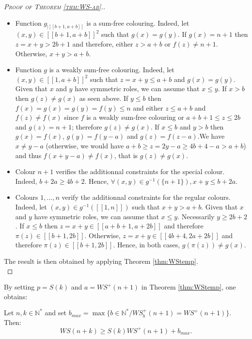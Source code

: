 \documentclass[final,onefignum,onetabnum]{siamart190516}
\newcommand{\WS}{\mathit{WS}}
\begin{document}
\begin{proof}[\textsc{Proof of Theorem \ref{thm:WS-ab}.}]
\begin{itemize}
\item Function \(g_{|[\![b + 1, a + b]\!]}\) is a sum-free colouring. Indeed, let \((x, y) \in 
	[\![b + 1, a + b]\!]^2\) such that \(g(x) = g(y)\). If \(g(x) = n + 1\) then \(z = x + y > 2 b + 1\) 
	and therefore, either \(z > a + b\) or \(f(z) \neq n + 1\). Otherwise, \(x + y > a + b\).
\item Function \(g\) is a weakly sum-free colouring. Indeed, let \((x, y) \in [\![1, a + b]\!]^2\) such that 
	\(z = x + y \leqslant a + b\) and \(g(x) = g(y)\). Given that \(x\) and \(y\) have symmetric roles, 
	we can assume that \(x \leqslant y\). If \(x > b\) then \(g(z) \neq g(x)\) as seen above. If \(y \leqslant b\) then 
	\(f(x) = g(x) = g(y) = f(y) \leqslant n\) and either \(z \leqslant a + b\) and \(f(z) \neq f(x)\) since \(f\) is a weakly 
	sum-free colouring or \(a + b + 1 \leqslant z \leqslant 2 b\) and \(g(z) = n + 1\); therefore \(g(z) \neq g(x)\). If 
	\(x \leqslant b\) and \(y > b\) then \(g(x) = f(x)\), \(g(y) = f(y - a)\) and \(g(z) = f(z - a)\).We have \(x \neq y - a\) 
	(otherwise, we would have \(a + b \geqslant z = 2 y  - a \geqslant 4 b + 4 - a > a + b\)) and thus \(f(x + y - a) \neq f(x)\),
	that is \(g(z) \neq g(x)\).
\item Colour \(n + 1\) verifies the additionnal constraints for the special colour. Indeed, \(b + 2 a \geqslant 4 b + 2\). 
	Hence, \(\forall (x, y) \in g^{-1}(\{n + 1\}), x + y \leqslant b + 2 a\).
\item Colours \(1, ..., n\) verify the additionnal constraints for the regular colours. Indeed, let 
	\((x, y) \in g^{-1}([\![1, n]\!])\) such that \(x + y > a + b\). Given that \(x\) and \(y\) have symmetric roles, 
	we can assume that \(x \leqslant y\). Necessarily \(y \geqslant 2 b + 2\). If \(x \leqslant b\) then 
	\(z = x + y \in [\![a + b + 1, a + 2 b]\!]\) and therefore \(\pi(z) \in [\![b + 1, 2 b]\!]\). Otherwise, 
	\(z = x + y \in [\![4 b + 4, 2 a + 2 b]\!]\) and therefore \(\pi(z) \in [\![b + 1, 2 b]\!]\). Hence, in both cases, 
	\(g(\pi(z)) \neq g(x)\).
\end{itemize}

The result is then obtained by applying Theorem \ref{thm:WStemp}. \\
\end{proof}

By setting \(p = S(k)\) and \(a = \WS^+(n + 1)\) in Theorem \ref{thm:WStemp}, one obtains:

\begin{corollary}
\label{cor:ineqWS+}
Let \(n,k \in \mathbb{N}^*\) and set \( b_{max} = \max \{b\in \mathbb{N}^*/ \WS_b^+(n+1) = \WS^+(n+1)\}\).
Then:
\[
\WS(n+k) \geqslant S(k) \WS^+(n+1)+b_{max}.
\]
\end{corollary}
\end{document}
